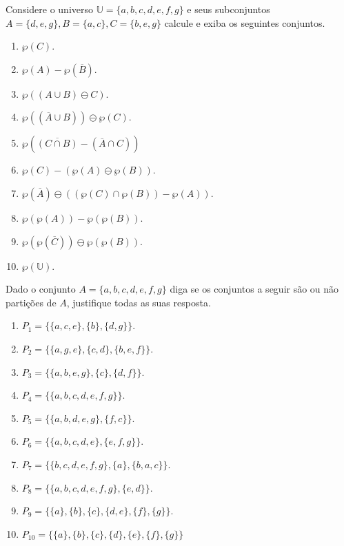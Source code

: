 \begin{exercise}\label{exerc:Conjuntos13}
	Considere o universo $\mathbb{U} = \{a, b, c, d, e, f, g\}$ e seus subconjuntos $A = \{d, e, g\}, B = \{a, c\}, C =\{b, e, g\}$ calcule e exiba os seguintes conjuntos. 
\end{exercise}

\begin{enumerate}
	\item $\wp(C)$.
	\item $\wp(A) - \wp(\overline{B})$.
	\item $\wp((A \cup B) \ominus C)$.
	\item $\wp((\overline{A} \cup B)) \ominus \wp(C)$.
	\item $\wp(\overline{(C \cap B)} - (\overline{A} \cap C))$
	\item $\wp(C) - (\wp(A) \ominus \wp(B))$.
	\item $\wp(\overline{A}) \ominus ((\wp(C) \cap \wp(B))  -  \wp(A))$.
	\item $\wp(\wp(A)) - \wp(\wp(B))$.
	\item $\wp(\wp(\overline{C})) \ominus \wp(\wp(B))$.
	\item $\wp(\mathbb{U})$.
\end{enumerate}

\begin{exercise}\label{exerc:Conjuntos14}
	Dado o conjunto $A = \{a, b, c, d, e, f, g\}$ diga se os conjuntos a seguir são ou não partições de $A$, justifique todas as suas resposta.
\end{exercise}

\begin{enumerate}
	\item $P_1 = \{\{a, c, e\}, \{b\}, \{d, g\}\}$.
	\item $P_2 = \{\{a, g, e\}, \{c, d\}, \{b, e, f\}\}$.
	\item $P_3 = \{\{a, b, e, g\}, \{c\}, \{d, f\}\}$.
	\item $P_4 = \{\{a, b, c, d, e, f, g\}\}$.
	\item $P_5 = \{\{a, b, d, e, g\}, \{f, c\}\}$.
	\item $P_6 = \{\{a, b, c, d, e\}, \{e, f, g\}\}$.
	\item $P_7 = \{\{b, c, d, e, f, g\}, \{a\}, \{b, a,c\}\}$.
	\item $P_8 = \{\{a, b, c, d, e, f, g\}, \{e, d\}\}$.
	\item $P_9 = \{\{a\}, \{b\}, \{c\}, \{d,e\}, \{f\}, \{g\}\}$.
	\item $P_{10} = \{\{a\}, \{b\}, \{c\}, \{d\}, \{e\}, \{f\}, \{g\}\}$
\end{enumerate}

